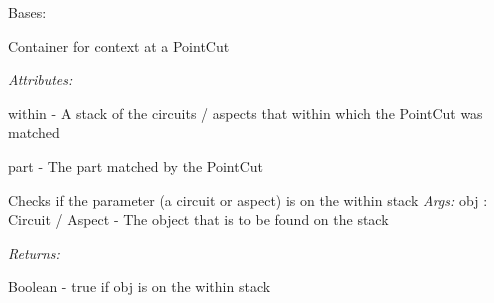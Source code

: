 \documentclass[letterpaper,10pt,english]{sphinxmanual}
\begin{document}
\begin{fulllineitems}
\label{modules/index:aosb.core.PointCutContext}
Bases: 

Container for context at a PointCut

\begin{DUlineblock}{0em}
\item[] \emph{Attributes:}
\item[]
\begin{DUlineblock}{\DUlineblockindent}
\item[] within - A stack of the circuits / aspects that within which the PointCut was matched
\item[] part - The part matched by the PointCut
\end{DUlineblock}
\end{DUlineblock}

\begin{fulllineitems}
\label{modules/index:aosb.core.PointCutContext.isWithin}
Checks if the parameter (a circuit or aspect) is on the within stack
\textbar{} \emph{Args:}
\textbar{}     obj : Circuit / Aspect - The object that is to be found on the stack

\begin{DUlineblock}{0em}
\item[] \emph{Returns:}
\item[]
\begin{DUlineblock}{\DUlineblockindent}
\item[] Boolean - true if obj is on the within stack
\end{DUlineblock}
\end{DUlineblock}

\end{fulllineitems}


\end{fulllineitems}

\end{document}
